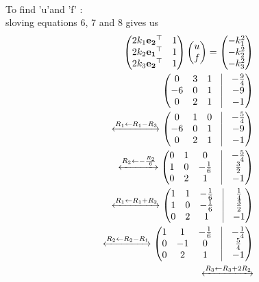 \documentclass[8pt,a4paper]{report}
\newcommand{\myvec}[1]{\ensuremath{\begin{pmatrix}#1\end{pmatrix}}}
\let\vec\mathbf
\begin{document}
\begin{multicols}{2}
\begin{align}
              \end{align}
 \raggedright To find 'u'and 'f' :\\
                  sloving equations 6, 7 and 8 gives us
                       \begin{align*}
			       \myvec{2k_1\vec{e_2}^{\top}&1\\
			              2k_2\vec{e_1}^{\top}&1\\
				      2k_3\vec{e_2}^{\top}&1}\myvec{u\\f} =\myvec{-k_1^2\\-k_2^2\\-k_3^2}
                         \\ 
			    \myvec{
				    0 & 3 & 1&\vrule & -\frac{9}{4}
			        \\
			            -6 & 0 &1 &\vrule & -9
			        \\
			            0&2&1&\vrule&-1
		                  }
		         \\	
          	           \xleftrightarrow[]{R_1 \leftarrow R_1-R_3 }
			       \myvec{
				       0 & 1 & 0&\vrule & -\frac{5}{4} 
				\\     
				      -6 & 0 & 1&\vrule & -9
			        \\
			               0 & 2&1 &\vrule & -1
		                  }
		         \\
			       \xleftrightarrow[]{R_2 \leftarrow -\frac{R_2}{6} }
			    \myvec{
				     0 & 1 & 0&\vrule & -\frac{5}{4}
			          \\
			             1 & 0  &-\frac{1}{6}&\vrule & \frac{3}{2}
			          \\
			             0&2&1&\vrule&-1
		                  }
		         \\
			       \xleftrightarrow[]{R_1 \leftarrow R_1+R_2 }
			       \myvec{
				       1 & 1 & -\frac{1}{6}&\vrule & \frac{1}{4}
				       \\
				       1 & 0  &-\frac{1}{6}&\vrule & \frac{3}{2}
				       \\
				       0&2&1&\vrule&-1
			         }
			 \\
			       \xleftrightarrow[]{R_2 \leftarrow R_2-R_1 }
			       \myvec{
				       1 & 1 & -\frac{1}{6}&\vrule & -\frac{1}{4}
				       \\
                                             0 & -1  &0&\vrule & \frac{5}{4}
					     \\
					     0&2&1&\vrule&-1
			            }
				    \\
                                \xleftrightarrow[]{R_3 \leftarrow R_3+2R_2 }

\end{align*}
\end{multicols}
\end{document}
